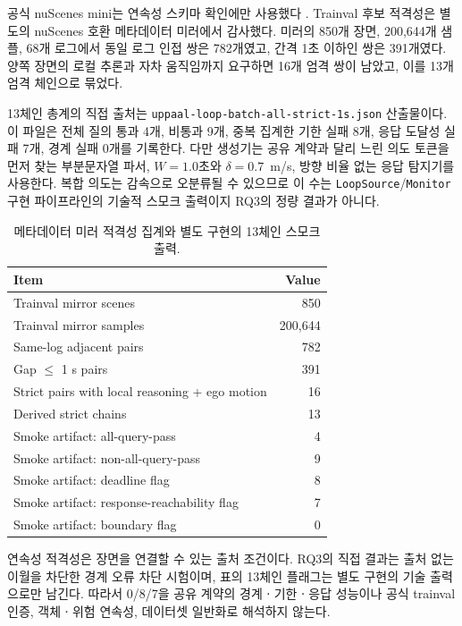 공식 nuScenes mini는 연속성 스키마 확인에만 사용했다 \cite{nuscenes2026website}. Trainval 후보 적격성은 별도의 nuScenes 호환 메타데이터 미러에서 감사했다. 미러의 850개 장면, 200,644개 샘플, 68개 로그에서 동일 로그 인접 쌍은 782개였고, 간격 1초 이하인 쌍은 391개였다. 양쪽 장면의 로컬 추론과 자차 움직임까지 요구하면 16개 엄격 쌍이 남았고, 이를 13개 엄격 체인으로 묶었다.

13체인 총계의 직접 출처는 \texttt{uppaal-loop-batch-all-strict-1s.json} 산출물이다. 이 파일은 전체 질의 통과 4개, 비통과 9개, 중복 집계한 기한 실패 8개, 응답 도달성 실패 7개, 경계 실패 0개를 기록한다. 다만 생성기는 공유 계약과 달리 느린 의도 토큰을 먼저 찾는 부분문자열 파서, $W=1.0$초와 $\delta=0.7$~m/s, 방향 비율 없는 응답 탐지기를 사용한다. 복합 의도는 감속으로 오분류될 수 있으므로 이 수는 \texttt{LoopSource}/\texttt{Monitor} 구현 파이프라인의 기술적 스모크 출력이지 RQ3의 정량 결과가 아니다.

\begin{table}[t]
\centering
\caption{메타데이터 미러 적격성 집계와 별도 구현의 13체인 스모크 출력.}
\label{tab:scene-continuity-results}
\footnotesize
\begin{tabular}{lr}
\toprule
Item & Value \\
\midrule
Trainval mirror scenes & 850 \\
Trainval mirror samples & 200,644 \\
Same-log adjacent pairs & 782 \\
Gap $\leq$ 1 s pairs & 391 \\
Strict pairs with local reasoning + ego motion & 16 \\
Derived strict chains & 13 \\
Smoke artifact: all-query-pass & 4 \\
Smoke artifact: non-all-query-pass & 9 \\
Smoke artifact: deadline flag & 8 \\
Smoke artifact: response-reachability flag & 7 \\
Smoke artifact: boundary flag & 0 \\
\bottomrule
\end{tabular}
\end{table}

연속성 적격성은 장면을 연결할 수 있는 출처 조건이다. RQ3의 직접 결과는 출처 없는 이월을 차단한 경계 오류 차단 시험이며, 표의 13체인 플래그는 별도 구현의 기술 출력으로만 남긴다. 따라서 0/8/7을 공유 계약의 경계ㆍ기한ㆍ응답 성능이나 공식 trainval 인증, 객체ㆍ위험 연속성, 데이터셋 일반화로 해석하지 않는다.

